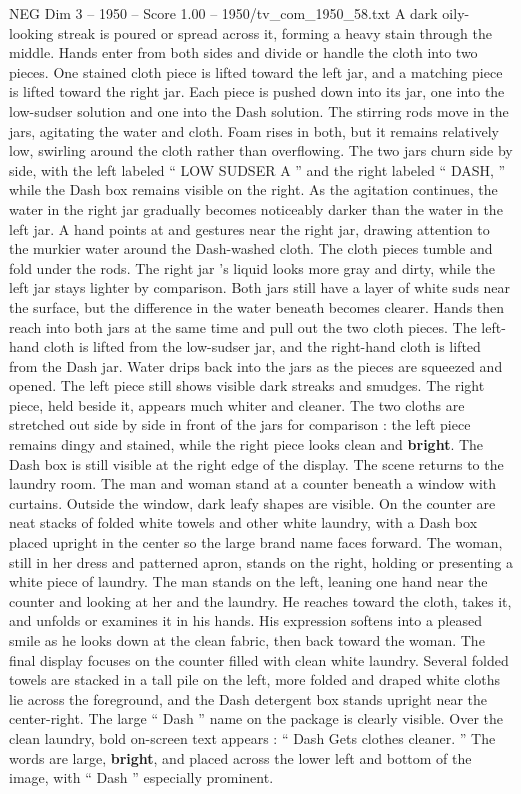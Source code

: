 \begin{textsample}{NEG Dim 3 – 1950 – Score 1.00 – 1950/tv\_com\_1950\_58.txt}
A dark oily-looking streak is poured or spread across it, forming a heavy stain through the middle.
Hands enter from both sides and divide or handle the cloth into two pieces.
One stained cloth piece is lifted toward the left jar, and a matching piece is lifted toward the right jar.
Each piece is pushed down into its jar, one into the low-sudser solution and one into the Dash solution.
The stirring rods move in the jars, agitating the water and cloth.
Foam rises in both, but it remains relatively low, swirling around the cloth rather than overflowing.
The two jars churn side by side, with the left labeled “ LOW SUDSER A ” and the right labeled “ DASH, ” while the Dash box remains visible on the right.
As the agitation continues, the water in the right jar gradually becomes noticeably darker than the water in the left jar.
A hand points at and gestures near the right jar, drawing attention to the murkier water around the Dash-washed cloth.
The cloth pieces tumble and fold under the rods.
The right jar ’s liquid looks more gray and dirty, while the left jar stays lighter by comparison.
Both jars still have a layer of white suds near the surface, but the difference in the water beneath becomes clearer.
Hands then reach into both jars at the same time and pull out the two cloth pieces.
The left-hand cloth is lifted from the low-sudser jar, and the right-hand cloth is lifted from the Dash jar.
Water drips back into the jars as the pieces are squeezed and opened.
The left piece still shows visible dark streaks and smudges.
The right piece, held beside it, appears much whiter and cleaner.
The two cloths are stretched out side by side in front of the jars for comparison : the left piece remains dingy and stained, while the right piece looks clean and \textbf{bright}.
The Dash box is still visible at the right edge of the display.
The scene returns to the laundry room.
The man and woman stand at a counter beneath a window with curtains.
Outside the window, dark leafy shapes are visible.
On the counter are neat stacks of folded white towels and other white laundry, with a Dash box placed upright in the center so the large brand name faces forward.
The woman, still in her dress and patterned apron, stands on the right, holding or presenting a white piece of laundry.
The man stands on the left, leaning one hand near the counter and looking at her and the laundry.
He reaches toward the cloth, takes it, and unfolds or examines it in his hands.
His expression softens into a pleased smile as he looks down at the clean fabric, then back toward the woman.
The final display focuses on the counter filled with clean white laundry.
Several folded towels are stacked in a tall pile on the left, more folded and draped white cloths lie across the foreground, and the Dash detergent box stands upright near the center-right.
The large “ Dash ” name on the package is clearly visible.
Over the clean laundry, bold on-screen text appears : “ Dash Gets clothes cleaner. ” The words are large, \textbf{bright}, and placed across the lower left and bottom of the image, with “ Dash ” especially prominent.

\end{textsample}

